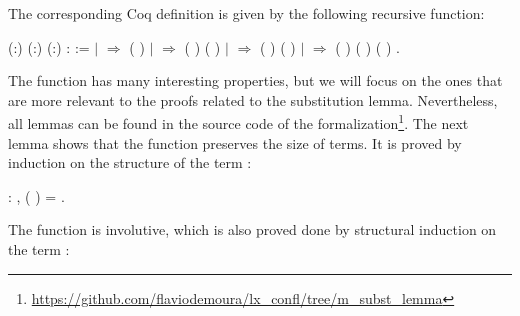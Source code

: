 The corresponding Coq definition is given by the following recursive function: 
\begin{coqdoccode}
\coqdocemptyline
\coqdocnoindent
{}  (:) (:) (:) :  :=\coqdoceol
\coqdocindent{1.00em}
  \coqdoceol
\coqdocindent{1.00em}
\ensuremath{|}       \ensuremath{\Rightarrow}  (   )\coqdoceol
\coqdocindent{1.00em}
\ensuremath{|}     \ensuremath{\Rightarrow}  (   ) (   )\coqdoceol
\coqdocindent{1.00em}
\ensuremath{|}    \ensuremath{\Rightarrow}  (   ) (   )\coqdoceol
\coqdocindent{1.00em}
\ensuremath{|}     \ensuremath{\Rightarrow}  (   ) (   ) (   )\coqdoceol
\coqdocindent{1.00em}
.\coqdoceol
\coqdocemptyline
\coqdocemptyline
\end{coqdoccode}
The  function has many interesting properties, but we will focus on the ones that are more relevant to the proofs related to the substitution lemma. Nevertheless, all lemmas can be found in the source code of the formalization\footnote{\url{https://github.com/flaviodemoura/lx_confl/tree/m_subst_lemma}}. The next lemma shows that the  function preserves the size of terms. It is proved by induction on the structure of the term : 
\begin{coqdoccode}
\coqdocemptyline
\coqdocnoindent
{}  : \coqdockw{\ensuremath{\forall}}   ,  (   ) =  .\coqdoceol
\coqdocemptyline
\coqdocemptyline
\end{coqdoccode}
The  function is involutive, which is also proved done by structural induction on the term : 
